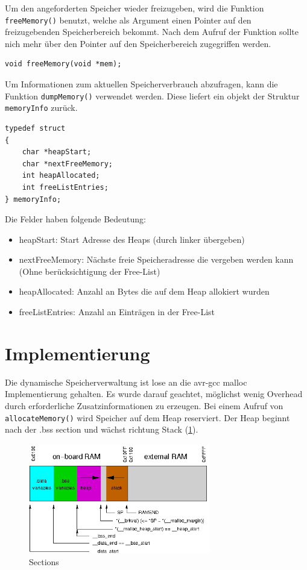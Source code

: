 \documentclass[fontsize=12pt, toc=bibliography, notitlepage]{scrreprt}
\begin{document}
Um den angeforderten Speicher wieder freizugeben, wird die Funktion \lstinline$freeMemory()$ benutzt, welche als Argument einen Pointer auf den freizugebenden  Speicherbereich bekommt. Nach dem Aufruf der Funktion sollte nich mehr über den Pointer auf den Speicherbereich zugegriffen werden.

\begin{lstlisting}[title=memory.h]
void freeMemory(void *mem);
\end{lstlisting}

Um Informationen zum aktuellen Speicherverbrauch abzufragen, kann die Funktion \lstinline$dumpMemory()$ verwendet werden. Diese liefert ein objekt der Struktur \lstinline$memoryInfo$ zurück.

\begin{lstlisting}[title=memory.h]
typedef struct
{
	char *heapStart;
	char *nextFreeMemory;
	int heapAllocated;
	int freeListEntries;
} memoryInfo;
\end{lstlisting}

Die Felder haben folgende Bedeutung:

\begin{itemize}
	\item heapStart: Start Adresse des Heaps (durch linker übergeben)
	\item nextFreeMemory: Nächste freie Speicheradresse die vergeben werden kann (Ohne berücksichtigung der Free-List)
	\item heapAllocated: Anzahl an Bytes die auf dem Heap allokiert wurden
	\item freeListEntries: Anzahl an Einträgen in der Free-List
\end{itemize}

\section{Implementierung}
\label{subsec:mem-impl}
Die dynamische Speicherverwaltung ist lose an die avr-gcc malloc Implementierung gehalten. Es wurde darauf geachtet, möglichst wenig Overhead durch erforderliche Zusatzinformationen zu erzeugen. Bei einem Aufruf von \lstinline$allocateMemory()$ wird Speicher auf dem Heap reserviert. Der Heap beginnt nach der .bss section und wächst richtung Stack (\ref{fig:sections}).

\begin{figure}[H]
	\centering
	\includegraphics[width=300px]{images/malloc-std.png}
	\caption{Sections}
	\label{fig:sections}
\end{figure}
\end{document}
